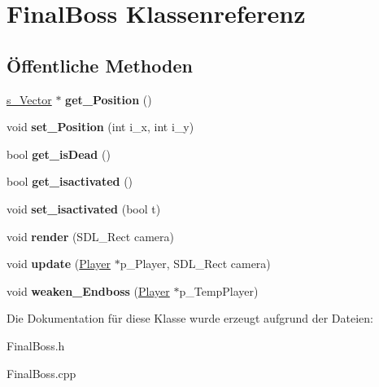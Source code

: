 \hypertarget{class_final_boss}{\section{Final\-Boss Klassenreferenz}
\label{class_final_boss}
}
\subsection*{Öffentliche Methoden}
\begin{DoxyCompactItemize}
\item 
\hypertarget{class_final_boss_a6c30600b7492a40d2ec99874d41296b0}{\hyperlink{structs___vector}{s\-\_\-\-Vector} $\ast$ {\bfseries get\-\_\-\-Position} ()}\label{class_final_boss_a6c30600b7492a40d2ec99874d41296b0}

\item 
\hypertarget{class_final_boss_a65029b764ec03a87caf71e7687d23306}{void {\bfseries set\-\_\-\-Position} (int i\-\_\-x, int i\-\_\-y)}\label{class_final_boss_a65029b764ec03a87caf71e7687d23306}

\item 
\hypertarget{class_final_boss_abacad04a4ff64dd94b3338b7cab122f2}{bool {\bfseries get\-\_\-is\-Dead} ()}\label{class_final_boss_abacad04a4ff64dd94b3338b7cab122f2}

\item 
\hypertarget{class_final_boss_aa0baaf57ed8bacb2174fbcc65b75cec9}{bool {\bfseries get\-\_\-isactivated} ()}\label{class_final_boss_aa0baaf57ed8bacb2174fbcc65b75cec9}

\item 
\hypertarget{class_final_boss_aa9ee8f4ddea7ecfc2d7b9bbaf6ca73a6}{void {\bfseries set\-\_\-isactivated} (bool t)}\label{class_final_boss_aa9ee8f4ddea7ecfc2d7b9bbaf6ca73a6}

\item 
\hypertarget{class_final_boss_a0dfe88f2e430bd3a8760801809ab7c01}{void {\bfseries render} (S\-D\-L\-\_\-\-Rect camera)}\label{class_final_boss_a0dfe88f2e430bd3a8760801809ab7c01}

\item 
\hypertarget{class_final_boss_a201e58c54ae09fbfd97bf6ef4fb2843f}{void {\bfseries update} (\hyperlink{class_player}{Player} $\ast$p\-\_\-\-Player, S\-D\-L\-\_\-\-Rect camera)}\label{class_final_boss_a201e58c54ae09fbfd97bf6ef4fb2843f}

\item 
\hypertarget{class_final_boss_a1579fd9da81da66bbed75799f7113be9}{void {\bfseries weaken\-\_\-\-Endboss} (\hyperlink{class_player}{Player} $\ast$p\-\_\-\-Temp\-Player)}\label{class_final_boss_a1579fd9da81da66bbed75799f7113be9}

\end{DoxyCompactItemize}


Die Dokumentation für diese Klasse wurde erzeugt aufgrund der Dateien\-:\begin{DoxyCompactItemize}
\item 
Final\-Boss.\-h\item 
Final\-Boss.\-cpp\end{DoxyCompactItemize}
